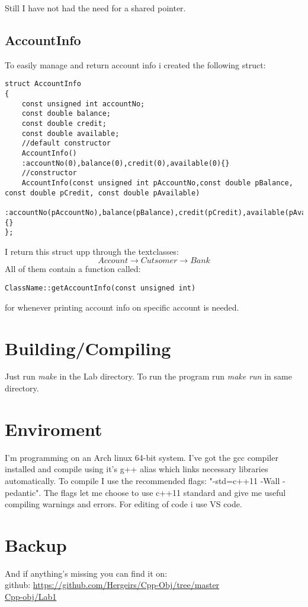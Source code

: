 \documentclass[11pt]{article}
\begin{document}
Still I have not had the need for a shared pointer. 

\subsection{AccountInfo}
To easily manage and return account info i created the following struct:

\begin{lstlisting}
struct AccountInfo
{
	const unsigned int accountNo;
	const double balance;
	const double credit;
	const double available;
	//default constructor
	AccountInfo()
	:accountNo(0),balance(0),credit(0),available(0){}
	//constructor
	AccountInfo(const unsigned int pAccountNo,const double pBalance, const double pCredit, const double pAvailable)
	:accountNo(pAccountNo),balance(pBalance),credit(pCredit),available(pAvailable){}
};
\end{lstlisting}

I return this struct upp through the textclasses: 
$$Account \rightarrow Cutsomer \rightarrow Bank$$
All of them contain a function called: 

\begin{lstlisting}
ClassName::getAccountInfo(const unsigned int)
\end{lstlisting}
for whenever printing account info on specific account is needed.

\section{Building/Compiling}
Just run \emph{make} in the Lab directory.
To run the program run \emph{make run} in same directory.

\section{Enviroment}
I'm programming on an Arch linux 64-bit system. I've got the gcc compiler installed and compile using it's g++ alias which links necessary libraries automatically. To compile I use the recommended flags: "-std=c++11 -Wall -pedantic". The flags let me choose to use c++11 standard and give me useful compiling warnings and errors. 
For editing of code i use VS code.

\section{Backup}
And if anything's missing you can find it on: \\
github: \url{https://github.com/Hergeirs/Cpp-Obj/tree/master} \\
\href{https://github.com/Hergeirs/Cpp-Obj/tree/master/Skei2}{Cpp-obj/Lab1}



\flushright{\today}
\end{document}

